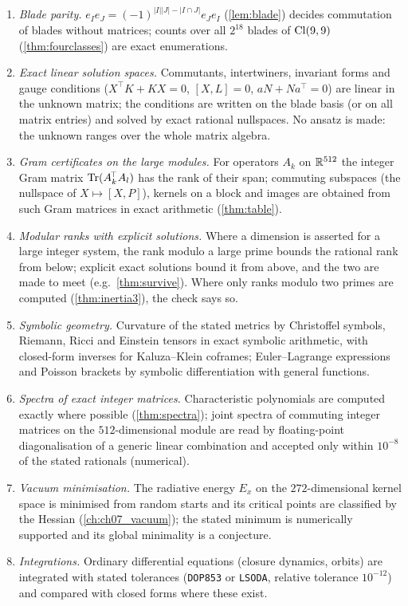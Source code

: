 \begin{enumerate}[label=(A\arabic*),leftmargin=2.6em]
\item \emph{Blade parity.} $e_Ie_J=(-1)^{|I||J|-|I\cap J|}e_Je_I$ (\cref{lem:blade}) decides commutation of blades without matrices; counts over
all $2^{18}$ blades of $\mathrm{Cl}(9,9)$ (\cref{thm:fourclasses}) are exact enumerations.
\item \emph{Exact linear solution spaces.} Commutants, intertwiners, invariant forms and gauge conditions ($X^{\!\top}K+KX=0$, $[X,L]=0$,
$aN+Na^{\!\top}=0$) are linear in the unknown matrix; the conditions are written on the blade basis (or on all matrix entries) and solved by
exact rational nullspaces. No ansatz is made: the unknown ranges over the whole matrix algebra.
\item \emph{Gram certificates on the large modules.} For operators $A_k$ on $\mathbb{R}^{512}$ the integer Gram matrix $\operatorname{Tr}(A_k^{\!\top}A_l)$ has the rank of
their span; commuting subspaces (the nullspace of $X\mapsto[X,P]$), kernels on a block and images are obtained from such Gram matrices in exact
arithmetic (\cref{thm:table}).
\item \emph{Modular ranks with explicit solutions.} Where a dimension is asserted for a large integer system, the rank modulo a large prime
bounds the rational rank from below; explicit exact solutions bound it from above, and the two are made to meet (e.g.\ \cref{thm:survive}).
Where only ranks modulo two primes are computed (\cref{thm:inertia3}), the check says so.
\item \emph{Symbolic geometry.} Curvature of the stated metrics by Christoffel symbols, Riemann, Ricci and Einstein tensors in exact
symbolic arithmetic, with closed-form inverses for Kaluza--Klein coframes; Euler--Lagrange expressions and Poisson brackets by symbolic
differentiation with general functions.
\item \emph{Spectra of exact integer matrices.} Characteristic polynomials are computed exactly where possible (\cref{thm:spectra}); joint
spectra of commuting integer matrices on the $512$-dimensional module are read by floating-point diagonalisation of a generic linear
combination and accepted only within $10^{-8}$ of the stated rationals (numerical).
\item \emph{Vacuum minimisation.} The radiative energy $E_x$ on the $272$-dimensional kernel space is minimised from random starts and its
critical points are classified by the Hessian (\cref{ch:ch07_vacuum}); the stated minimum is numerically supported and its global
minimality is a conjecture.
\item \emph{Integrations.} Ordinary differential equations (closure dynamics, orbits) are integrated with stated tolerances
(\texttt{DOP853} or \texttt{LSODA}, relative tolerance $10^{-12}$) and compared with closed forms where these exist.
\end{enumerate}

